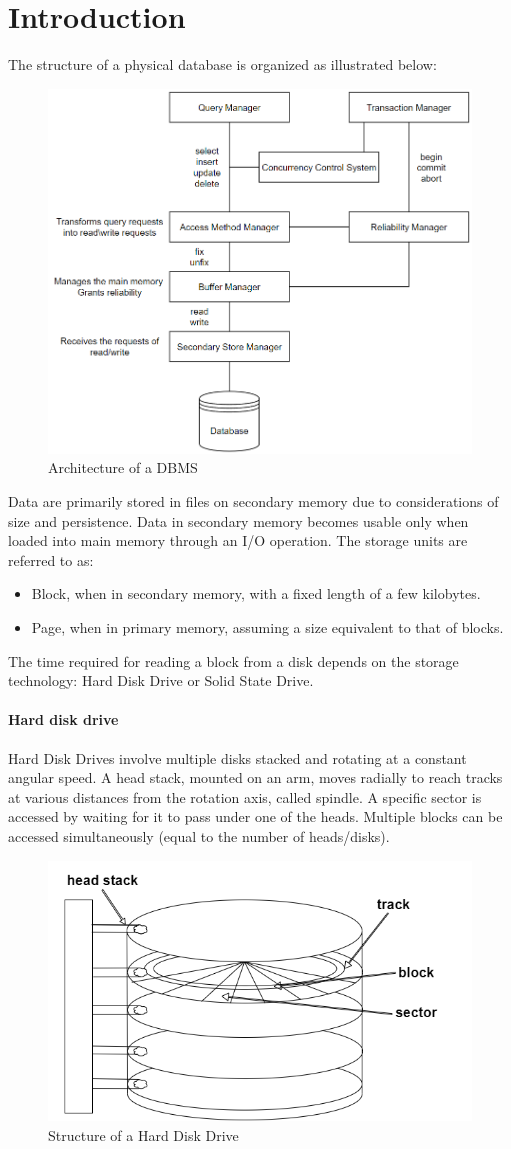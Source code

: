 \section{Introduction}

The structure of a physical database is organized as illustrated below:
\begin{figure}[H]
    \centering
    \includegraphics[width=0.5\linewidth]{images/structure.png}
    \caption{Architecture of a DBMS}
\end{figure} 

Data are primarily stored in files on secondary memory due to considerations of size and persistence.
Data in secondary memory becomes usable only when loaded into main memory through an I/O operation.
The storage units are referred to as:
\begin{itemize}
    \item Block, when in secondary memory, with a fixed length of a few kilobytes.
    \item Page, when in primary memory, assuming a size equivalent to that of blocks.
\end{itemize}
The time required for reading a block from a disk depends on the storage technology: Hard Disk Drive or Solid State Drive.

\paragraph*{Hard disk drive}
Hard Disk Drives involve multiple disks stacked and rotating at a constant angular speed.
A head stack, mounted on an arm, moves radially to reach tracks at various distances from the rotation axis, called spindle.
A specific sector is accessed by waiting for it to pass under one of the heads.
Multiple blocks can be accessed simultaneously (equal to the number of heads/disks).
\begin{figure}[H]
    \centering
    \includegraphics[width=0.35\linewidth]{images/hdd.png}
    \caption{Structure of a Hard Disk Drive}
\end{figure} 

